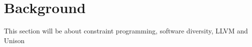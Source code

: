 \chapter{Background}

This section will be about constraint programming, software diversity, LLVM and Unison








